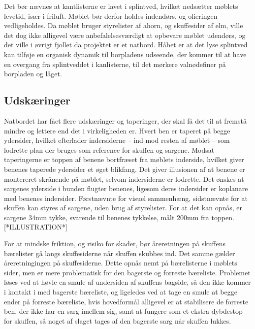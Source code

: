Det bør nævnes at kantlisterne er lavet i splintved, hvilket nedsætter møblets
levetid, især i friluft. Møblet bør derfor holdes indendørs, og olieringen
vedligeholdes. Da møblet bruger styrelister af ahorn, og skuffesider af elm,
ville det dog ikke alligevel være anbefalelsesværdigt at opbevare møblet udendørs,
og det ville i øvrigt fjollet da projektet er et natbord. Håbet er at det lyse
splintved kan tilføje en organisk dynamik til borpladens udseende, der kommer
til at have en overgang fra splintveddet i kanlisterne, til det mørkere
valnødefiner på borpladen og låget.


\subsection*{Udskæringer}
Natbordet har fået flere udskæringer og taperinger, der skal få det til at
fremstå mindre og lettere end det i virkeligheden er. Hvert ben er taperet på
begge ydersider, hvilket  efterlader indersiderne -- ind mod resten af møblet --
som lodrette plan der bruges som reference for skuffen og sargene. Modsat
taperingerne er toppen af benene bortfræset fra møblets inderside, hvilket giver
benenes taperede ydersider et øget blikfang. Det giver illusionen af at benene
er montereret skrånende på møblet, selvom indersiderne er lodrette. Det ønskes
at sargenes yderside i bunden flugter benenes, ligesom deres indersider er
koplanare med benenes indersider. Førstnævnte for visuel sammenhæng, sidstnævnte
for at skuffen kan styres af sargene, uden brug af styrelister. For at det kan
opnås, er sargene 34mm tykke, svarende til benenes tykkelse, målt 200mm fra
toppen. [*ILLUSTRATION*]

For at mindske friktion, og risiko for skader, bør åreretningen på skuffens
bærelister gå langs skuffesiderne når skuffen skubbes ind. Det samme gælder
åreretningingen på skuffesiderne. Dette opnås nemt på bærelisterne i møblets
sider, men er mere problematisk for den bagerste og forreste bæreliste.
Problemet løses ved at høvle en smule af undersiden af skuffens bagside, så den
ikke kommer i kontakt i med bagerste bæreliste, og ligeledes ved at tage en
smule at begge ender på forreste bæreliste, hvis hovedformål alligevel er at
stabilisere de forreste ben, der ikke har en sarg imellem sig, samt at fungere
som et ekstra dybdestop for skuffen, så noget af slaget tages af den
bagerste sarg når skuffen lukkes.
